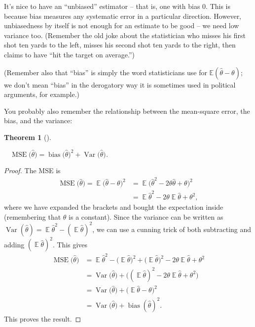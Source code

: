 \documentclass[
  letterpaper,
  DIV=11,
  numbers=noendperiod]{scrreprt}
\newcommand{\Exg}{\operatorname{\mathbb{E}}}
\newcommand{\Var}{\operatorname{Var}}
\theoremstyle{plain}
\newtheorem{theorem}{Theorem}[chapter]
\theoremstyle{definition}
\theoremstyle{definition}
\theoremstyle{remark}
\begin{document}
It's nice to have an ``unbiased'' estimator -- that is, one with bias 0.
This is because bias measures any systematic error in a particular
direction. However, unbiasedness by itself is not enough for an estimate
to be good -- we need low variance too. (Remember the old joke about the
statistician who misses his first shot ten yards to the left, misses his
second shot ten yards to the right, then claims to have ``hit the target
on average.'')

(Remember also that ``bias'' is simply the word statisticians use for
\(\mathbb E(\widehat\theta - \theta)\); we don't mean ``bias'' in the
derogatory way it is sometimes used in political arguments, for
example.)

You probably also remember the relationship between the mean-square
error, the bias, and the variance:

\begin{theorem}[]\protect\hypertarget{thm-MSE-bias}{}\label{thm-MSE-bias}

~
\(\operatorname{MSE}\big(\widehat\theta\big) = \operatorname{bias}\big(\widehat\theta\big)^2 + \operatorname{Var}\big(\widehat\theta\big)\).

\end{theorem}

\begin{proof}
The MSE is \begin{align}
  \operatorname{MSE}\big(\widehat\theta\big) = \Exg\big(\widehat\theta - \theta\big)^2
    &= \Exg \big(\widehat\theta^2 - 2\theta\widehat\theta + \theta\big)^2 \\
    &= \Exg \widehat\theta^2 - 2\theta \Exg \widehat\theta + \theta^2 ,
\end{align} where we have expanded the brackets and bought the
expectation inside (remembering that \(\theta\) is a constant). Since
the variance can be written as
\(\Var(\widehat\theta) = \Exg\widehat\theta^2 - (\Exg \widehat\theta)^2\),
we can use a cunning trick of both subtracting and adding
\((\Exg \widehat\theta)^2\). This gives \begin{align}
\operatorname{MSE}\big(\widehat\theta\big)
  &= \Exg \widehat\theta^2 - \big(\!\Exg \widehat\theta\big)^2 + \big(\!\Exg \widehat\theta\big)^2 - 2\theta \Exg \widehat\theta + \theta^2 \\
  &= \Var\big(\widehat\theta\big) + \big( (\Exg \widehat\theta)^2 - 2\theta \Exg \widehat\theta + \theta^2 \big) \\
  &= \Var\big(\widehat\theta\big) + \big( \! \Exg \widehat\theta - \theta\big)^2 \\
  &= \Var\big(\widehat\theta\big) + \operatorname{bias}(\widehat\theta)^2 .
\end{align} This proves the result.
\end{proof}
\end{document}
